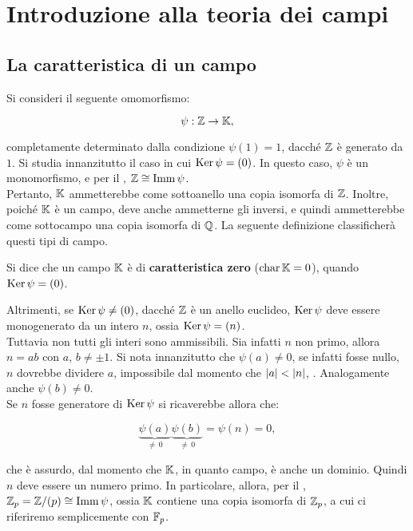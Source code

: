 \section{Introduzione alla teoria dei campi}

\subsection{La caratteristica di un campo}

Si consideri il seguente omomorfismo:

\[ \psi : \mathbb Z \to \mathbb{K}, \]

\vskip 0.1in

completamente determinato dalla condizione $\psi(1) = 1$, dacché
$\mathbb Z$ è generato da $1$. Si studia innanzitutto il caso in cui
$\operatorname{Ker} \psi = (0)$. In questo caso, $\psi$ è un monomorfismo, e per
il , $\mathbb Z \cong \operatorname{Imm} \psi$. \\

Pertanto, $\mathbb{K}$ ammetterebbe come sottoanello una copia isomorfa di $\mathbb Z$.
Inoltre, poiché $\mathbb{K}$ è un campo, deve anche ammetterne gli inversi, e quindi
ammetterebbe come sottocampo una copia isomorfa di $\mathbb Q$. La seguente
definizione classificherà questi tipi di campo. \\

\begin{definition}
    Si dice che un campo $\mathbb{K}$ è di \textbf{caratteristica zero} ($\operatorname{char} \mathbb{K} = 0$),
    quando $\operatorname{Ker} \psi = (0)$.
\end{definition}

Altrimenti, se $\operatorname{Ker} \psi \neq (0)$, dacché $\mathbb Z$ è un anello euclideo,
$\operatorname{Ker} \psi$ deve essere monogenerato da un intero $n$, ossia $\operatorname{Ker} \psi = (n)$. \\

Tuttavia non tutti gli interi sono ammissibili. Sia infatti $n$ non primo, allora
$n = ab$ con $a$, $b \neq \pm 1$. Si nota innanzitutto che $\psi(a) \neq 0$,
se infatti fosse nullo, $n$ dovrebbe dividere $a$, impossibile dal momento
che $\left|a\right| < \left|n\right|$, \Lightning{}. Analogamente anche $\psi(b) \neq 0$. \\

Se $n$ fosse generatore di $\operatorname{Ker} \psi$ si ricaverebbe allora che:

\[ \underbrace{\psi(a)}_{\neq\,0} \underbrace{\psi(b)}_{\neq\,0} = \psi(n) = 0, \]

\vskip 0.1in

che è assurdo, dal momento che $\mathbb{K}$, in quanto campo, è anche un dominio.
Quindi $n$ deve essere un numero primo. In particolare, allora, per
il , $\mathbb{Z}_p = \mathbb Z/(p) \cong \operatorname{Imm} \psi$,
ossia $\mathbb{K}$ contiene una copia isomorfa di $\mathbb{Z}_p$, a cui ci riferiremo
semplicemente con $\mathbb{F}_p$. \\

